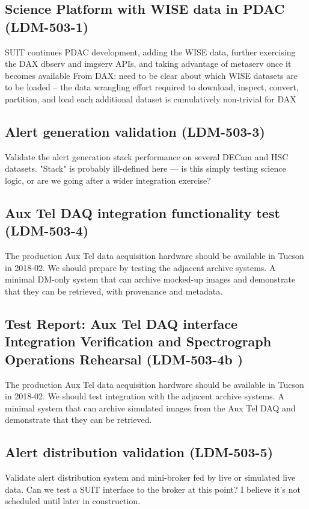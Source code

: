 \subsection{Science Platform with WISE data in PDAC \textbf{(LDM-503-1)}\label{LDM-503-1}}
SUIT continues PDAC development, adding the WISE data, further exercising the DAX dbserv and imgserv APIs, and taking advantage of metaserv once it becomes available
 \newline
From DAX: need to be clear about which WISE datasets are to be loaded -- the data wrangling effort required to download, inspect, convert, partition, and load each additional dataset is cumulatively non-trivial for DAX



\subsection{Alert generation validation \textbf{(LDM-503-3)}\label{LDM-503-3}}
Validate the alert generation stack performance on several DECam and HSC datasets.
 \newline
"Stack" is probably ill-defined here — is this simply testing science logic, or are we going after a wider integration exercise?
\subsection{Aux Tel DAQ integration functionality test \textbf{(LDM-503-4)}\label{LDM-503-4}}
The production Aux Tel data acquisition hardware should be available in Tucson in 2018-02. We should prepare by testing the adjacent archive systems.
 \newline
A minimal DM-only system that can archive mocked-up images and demonstrate that they can be retrieved, with provenance and metadata.
\subsection{Test Report: Aux Tel DAQ interface Integration Verification and Spectrograph Operations Rehearsal \textbf{(LDM-503-4b )}\label{LDM-503-4b }}
The production Aux Tel data acquisition hardware should be available in Tucson in 2018-02. We should test integration with the adjacent archive systems.
 \newline
A minimal system that can archive simulated images from the Aux Tel DAQ and demonstrate that they can be retrieved.
\subsection{Alert distribution validation \textbf{(LDM-503-5)}\label{LDM-503-5}}
Validate alert distribution system and mini-broker fed by live or simulated live data.
 \newline
Can we test a SUIT interface to the broker at this point? I believe it's not scheduled until later in construction.
